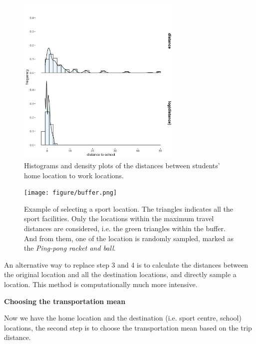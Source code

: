 \documentclass[]{article}
\begin{document}
\begin{figure}[!h]
    \centering
    \includegraphics[width=8cm]{figure/ditance_to_school.png}
    \caption{Histograms and density plots of the distances between students' home location to work locations. }
    \label{stu_work_hist}
\end{figure}

\begin{figure}[!h]
    \centering
    \texttt{[image: figure/buffer.png]}
    \caption{Example of selecting a sport location. The triangles indicates all the sport facilities. Only the locations within the maximum travel distances are considered, i.e. the green triangles within the buffer. And from them, one of the location is randomly sampled, marked as the \textit{Ping-pong racket and ball}. }
    \label{buffer}
\end{figure} 

An alternative way to replace step 3 and 4 is to calculate the distances between the original location and all the destination locations, and directly sample a location. This method is computationally much more intensive. 

\textbf{Choosing the transportation mean}

Now we have the home location and the destination (i.e. sport centre, school) locations, the second step is to choose the transportation mean based on the trip distance. 
\end{document}
